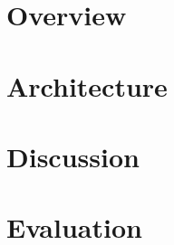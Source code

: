 \section{\dthreads{} Overview}


\section{\dthreads{} Architecture}


\section{Discussion}


\section{Evaluation}

